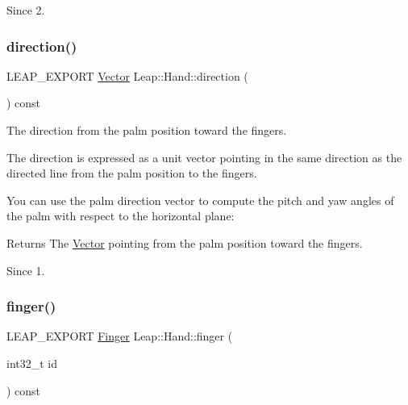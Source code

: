 \begin{DoxySince}{Since}
2. 
\end{DoxySince}
\mbox{\label{class_leap_1_1_hand_a71e62bf83996e26ccd497dd70803b46b}} 
\subsubsection{\texorpdfstring{direction()}{direction()}}
{\footnotesize\ttfamily L\+E\+A\+P\+\_\+\+E\+X\+P\+O\+RT \hyperlink{struct_leap_1_1_vector}{Vector} Leap\+::\+Hand\+::direction (\begin{DoxyParamCaption}{ }\end{DoxyParamCaption}) const}

The direction from the palm position toward the fingers.

The direction is expressed as a unit vector pointing in the same direction as the directed line from the palm position to the fingers.

You can use the palm direction vector to compute the pitch and yaw angles of the palm with respect to the horizontal plane\+:


\begin{DoxyCodeInclude}
\end{DoxyCodeInclude}


\begin{DoxyReturn}{Returns}
The \hyperlink{struct_leap_1_1_vector}{Vector} pointing from the palm position toward the fingers. 
\end{DoxyReturn}
\begin{DoxySince}{Since}
1. 
\end{DoxySince}
\mbox{\label{class_leap_1_1_hand_afe7cf68c3375a2e45f90d80698313ccb}} 
\subsubsection{\texorpdfstring{finger()}{finger()}}
{\footnotesize\ttfamily L\+E\+A\+P\+\_\+\+E\+X\+P\+O\+RT \hyperlink{class_leap_1_1_finger}{Finger} Leap\+::\+Hand\+::finger (\begin{DoxyParamCaption}\item[{int32\+\_\+t}]{id }\end{DoxyParamCaption}) const}

